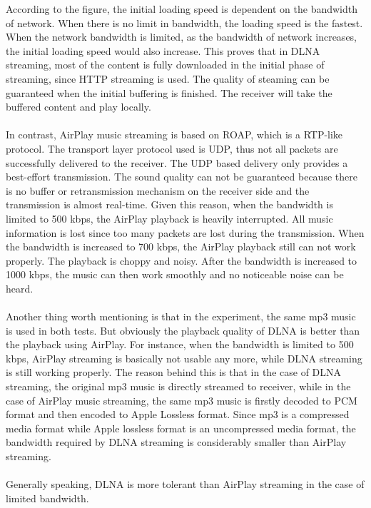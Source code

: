 According to the figure, the initial loading speed is dependent on the bandwidth of network. When there is no limit in bandwidth, the loading speed is the fastest. When the network bandwidth is limited, as the bandwidth of network increases, the initial loading speed would also increase. This proves that in DLNA streaming, most of the content is fully downloaded in the initial phase of streaming,  since HTTP streaming is used. The quality of steaming can be guaranteed when the initial buffering is finished. The receiver will take the buffered content and play locally.\\
\\
In contrast, AirPlay music streaming is based on ROAP, which is a RTP-like protocol. The transport layer protocol used is UDP, thus not all packets are successfully delivered to the receiver. The UDP based delivery only provides a best-effort transmission. The sound quality can not be guaranteed because there is no buffer or retransmission mechanism on the receiver side and the transmission is almost real-time. Given this reason, when the bandwidth is limited to 500 kbps, the AirPlay playback is heavily interrupted. All music information is lost since too many packets are lost during the transmission. When the bandwidth is increased to 700 kbps, the AirPlay playback still can not work properly. The playback is choppy and noisy. After the bandwidth is increased to 1000 kbps, the music can then work smoothly and no noticeable noise can be heard.\\
\\
Another thing worth mentioning is that in the experiment, the same mp3 music is used in both tests. But obviously the playback quality of DLNA is better than the playback using AirPlay. For instance, when the bandwidth is limited to 500 kbps, AirPlay streaming is basically not usable any more, while DLNA streaming is still working properly. The reason behind this is that in the case of DLNA streaming, the original mp3 music is directly streamed to receiver, while in the case of AirPlay music streaming, the same mp3 music is firstly decoded to PCM format and then encoded to Apple Lossless format. Since mp3 is a compressed media format while Apple lossless format is an uncompressed media format, the bandwidth required by DLNA streaming is considerably smaller than AirPlay streaming.\\
\\
Generally speaking, DLNA is more tolerant than AirPlay streaming in the case of limited bandwidth.\\

